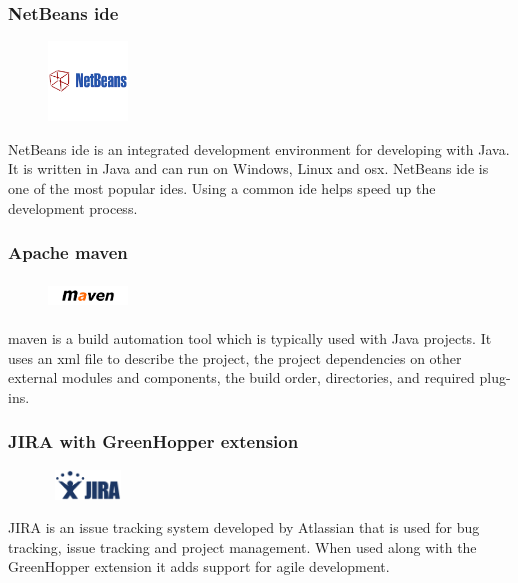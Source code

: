 \subsubsection{NetBeans \gls{ide}}
\begin{figure}
  \vspace{-50pt}
  \begin{center}
    \includegraphics[width=80px, height=80px]{NetBeans}
  \end{center}

\end{figure}
NetBeans \gls{ide} is an integrated development environment for developing with Java. It is written in Java and can run on Windows, Linux and \gls{osx}. NetBeans \gls{ide} is one of the most popular \gls{ide}s. Using a common \gls{ide} helps speed up the development process.

\subsubsection{Apache \gls{maven}}
\begin{figure}
  \vspace{-100pt}
  \begin{center}
    \includegraphics[width=80px,height=30px]{Maven}
  \end{center}

\end{figure}
\gls{maven} is a build automation tool which is typically used with Java projects. It uses an \gls{xml} file to describe the project, the project dependencies on other external modules and components, the build order, directories, and required plug-ins.   

\subsubsection{JIRA with GreenHopper extension}
\begin{figure}
  \vspace{-40pt}
  \begin{center}
    \includegraphics[width=80px,height=30px]{Jira}
  \end{center}

\end{figure}
JIRA is an issue tracking system developed by Atlassian that is used for bug tracking, issue tracking and project management. When used along with the GreenHopper extension it adds support for agile development.

